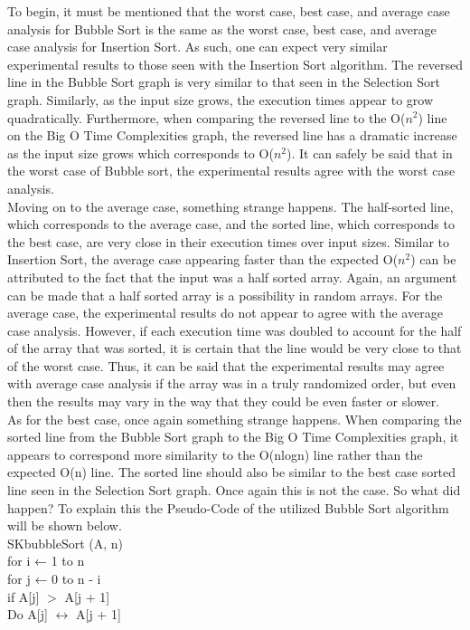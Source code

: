 \documentclass[12pt]{article}
\begin{document}
	
	To begin, it must be mentioned that the worst case, best case, and average case analysis for Bubble Sort is the same as the worst case, best case, and average case analysis for Insertion Sort. As such, one can expect very similar experimental results to those seen with the Insertion Sort algorithm. The reversed line in the Bubble Sort graph is very similar to that seen in the Selection Sort graph. Similarly, as the input size grows, the execution times appear to grow quadratically. Furthermore, when comparing the reversed line to the O($n^2$) line on the Big O Time Complexities graph, the reversed line has a dramatic increase as the input size grows which corresponds to O($n^2$). It can safely be said that in the worst case of Bubble sort, the experimental results agree with the worst case analysis. \\
\indent	Moving on to the average case, something strange happens. The half-sorted line, which corresponds to the average case, and the sorted line, which corresponds to the best case, are very close in their execution times over input sizes. Similar to Insertion Sort, the average case appearing faster than the expected O($n^2$) can be attributed to the fact that the input was a half sorted array. Again, an argument can be made that a half sorted array is a possibility in random arrays. For the average case, the experimental results do not appear to agree with the average case analysis. However, if each execution time was doubled to account for the half of the array that was sorted, it is certain that the line would be very close to that of the worst case. Thus, it can be said that the experimental results may agree with average case analysis if the array was in a truly randomized order, but even then the results may vary in the way that they could be even faster or slower. \\
\indent As for the best case, once again something strange happens. When comparing the sorted line from the Bubble Sort graph to the Big O Time Complexities graph, it appears to correspond more similarity to the O(nlogn) line rather than the expected O(n) line. The sorted line should also be similar to the best case sorted line seen in the Selection Sort graph. Once again this is not the case. So what did happen? To explain this the Pseudo-Code of the utilized Bubble Sort algorithm will be shown below.\\

SKbubbleSort (A, n)\\
\indent\indent	for i ← 1 to n\\
\indent\indent\indent		for j ← 0 to n - i\\
\indent\indent\indent\indent			if A[j] $>$ A[j + 1]\\
\indent\indent\indent\indent\indent				Do A[j] $\longleftrightarrow$ A[j + 1]\\
\end{document}
